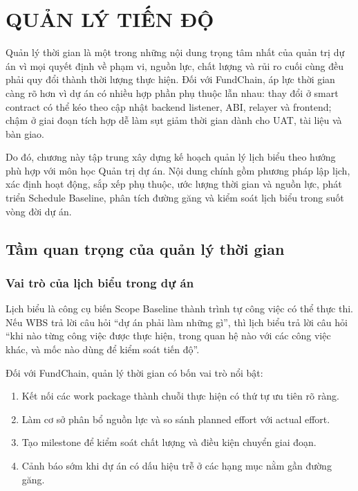 \chapter{QUẢN LÝ TIẾN ĐỘ}

Quản lý thời gian là một trong những nội dung trọng tâm nhất của quản trị dự án vì mọi quyết định về phạm vi, nguồn lực, chất lượng và rủi ro cuối cùng đều phải quy đổi thành thời lượng thực hiện. Đối với FundChain, áp lực thời gian càng rõ hơn vì dự án có nhiều hợp phần phụ thuộc lẫn nhau: thay đổi ở smart contract có thể kéo theo cập nhật backend listener, ABI, relayer và frontend; chậm ở giai đoạn tích hợp dễ làm sụt giảm thời gian dành cho UAT, tài liệu và bàn giao.

Do đó, chương này tập trung xây dựng kế hoạch quản lý lịch biểu theo hướng phù hợp với môn học Quản trị dự án. Nội dung chính gồm phương pháp lập lịch, xác định hoạt động, sắp xếp phụ thuộc, ước lượng thời gian và nguồn lực, phát triển Schedule Baseline, phân tích đường găng và kiểm soát lịch biểu trong suốt vòng đời dự án.

\iffalse
\section{Tầm quan trọng của quản lý thời gian}

\subsection{Vai trò của lịch biểu trong dự án}

Lịch biểu là công cụ biến Scope Baseline thành trình tự công việc có thể thực thi. Nếu WBS trả lời câu hỏi “dự án phải làm những gì”, thì lịch biểu trả lời câu hỏi “khi nào từng công việc được thực hiện, trong quan hệ nào với các công việc khác, và mốc nào dùng để kiểm soát tiến độ”.

Đối với FundChain, quản lý thời gian có bốn vai trò nổi bật:

\begin{enumerate}
  \item Kết nối các work package thành chuỗi thực hiện có thứ tự ưu tiên rõ ràng.
  \item Làm cơ sở phân bổ nguồn lực và so sánh planned effort với actual effort.
  \item Tạo milestone để kiểm soát chất lượng và điều kiện chuyển giai đoạn.
  \item Cảnh báo sớm khi dự án có dấu hiệu trễ ở các hạng mục nằm gần đường găng.
\end{enumerate}

